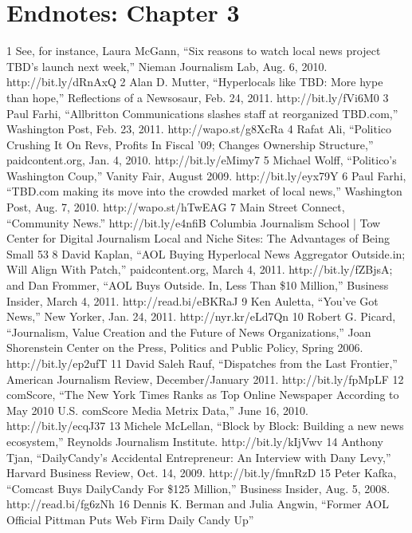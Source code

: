 \section{Endnotes: Chapter 3}
1 See, for instance, Laura McGann, ``Six reasons to watch local news project TBD’s launch next
week,'' Nieman Journalism Lab, Aug. 6, 2010. http://bit.ly/dRnAxQ
2 Alan D. Mutter, ``Hyperlocals like TBD: More hype than hope,'' Reflections of a Newsosaur,
Feb. 24, 2011. http://bit.ly/fVi6M0
3 Paul Farhi, ``Allbritton Communications slashes staff at reorganized TBD.com,'' Washington
Post, Feb. 23, 2011. http://wapo.st/g8XcRa
4 Rafat Ali, ``Politico Crushing It On Revs, Profits In Fiscal ’09; Changes Ownership Structure,''
paidcontent.org, Jan. 4, 2010. http://bit.ly/eMimy7
5 Michael Wolff, ``Politico’s Washington Coup,'' Vanity Fair, August 2009. http://bit.ly/eyx79Y
6 Paul Farhi, ``TBD.com making its move into the crowded market of local news,'' Washington
Post, Aug. 7, 2010. http://wapo.st/hTwEAG
7 Main Street Connect, ``Community News.'' http://bit.ly/e4nfiB
Columbia Journalism School | Tow Center for Digital Journalism
Local and Niche Sites: The Advantages of Being Small 53
8 David Kaplan, ``AOL Buying Hyperlocal News Aggregator Outside.in; Will Align With Patch,''
paidcontent.org, March 4, 2011. http://bit.ly/fZBjsA; and Dan Frommer, ``AOL Buys Outside.
In, Less Than \$10 Million,'' Business Insider, March 4, 2011. http://read.bi/eBKRaJ
9 Ken Auletta, ``You’ve Got News,'' New Yorker, Jan. 24, 2011. http://nyr.kr/eLd7Qn
10 Robert G. Picard, ``Journalism, Value Creation and the Future of News Organizations,'' Joan
Shorenstein Center on the Press, Politics and Public Policy, Spring 2006. http://bit.ly/ep2ufT
11 David Saleh Rauf, ``Dispatches from the Last Frontier,'' American Journalism Review,
December/January 2011. http://bit.ly/fpMpLF
12 comScore, ``The New York Times Ranks as Top Online Newspaper According to May 2010
U.S. comScore Media Metrix Data,'' June 16, 2010. http://bit.ly/ecqJ37
13 Michele McLellan, ``Block by Block: Building a new news ecosystem,'' Reynolds Journalism
Institute. http://bit.ly/kIjVwv
14 Anthony Tjan, ``DailyCandy’s Accidental Entrepreneur: An Interview with Dany Levy,''
Harvard Business Review, Oct. 14, 2009. http://bit.ly/fmnRzD
15 Peter Kafka, ``Comcast Buys DailyCandy For \$125 Million,'' Business Insider, Aug. 5, 2008.
http://read.bi/fg6zNh
16 Dennis K. Berman and Julia Angwin, ``Former AOL Official Pittman Puts Web Firm Daily
Candy Up''


